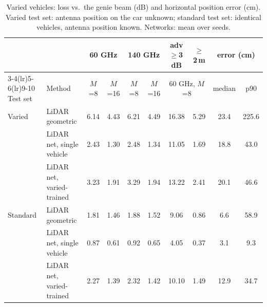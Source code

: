 \begin{table}[t]\centering\caption{Varied vehicles: loss vs.\ the genie beam (dB) and horizontal position error (cm). Varied test set: antenna position on the car unknown; standard test set: identical vehicles, antenna position known. Networks: mean over seeds.}\label{tab:varied}
\small\begin{tabular}{@{}llcccccccc@{}}\toprule
 & & \multicolumn{2}{c}{60 GHz} & \multicolumn{2}{c}{140 GHz} & adv$\geq$3\,dB & $\geq$2\,m & \multicolumn{2}{c}{error (cm)} \\
\cmidrule(lr){3-4}\cmidrule(lr){5-6}\cmidrule(lr){9-10}
Test set & Method & $M$=8 & $M$=16 & $M$=8 & $M$=16 & \multicolumn{2}{c}{60 GHz, $M$=8} & median & p90 \\\midrule
Varied & LiDAR geometric & 6.14 & 4.43 & 6.21 & 4.49 & 16.38 & 5.29 & 23.4 & 225.6 \\
 & LiDAR net, single vehicle & 2.43 & 1.30 & 2.48 & 1.34 & 11.05 & 1.69 & 18.8 & 43.0 \\
 & LiDAR net, varied-trained & 3.23 & 1.91 & 3.29 & 1.94 & 13.22 & 2.41 & 20.1 & 46.6 \\
\midrule
Standard & LiDAR geometric & 1.81 & 1.46 & 1.88 & 1.52 & 9.06 & 0.86 & 6.6 & 58.9 \\
 & LiDAR net, single vehicle & 0.87 & 0.61 & 0.92 & 0.65 & 4.05 & 0.37 & 3.1 & 9.3 \\
 & LiDAR net, varied-trained & 2.27 & 1.39 & 2.32 & 1.42 & 10.10 & 1.49 & 12.9 & 34.7 \\
\bottomrule\end{tabular}\end{table}
